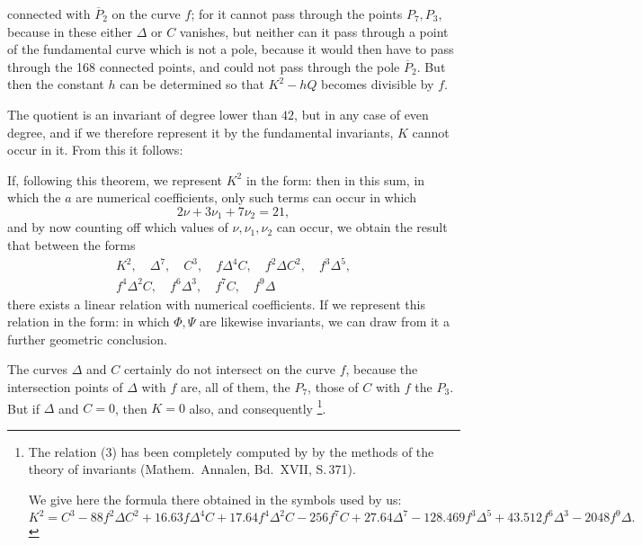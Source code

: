 connected with $\overline{P}_2$ on the curve $f$; for it
cannot pass through the points $P_7, P_3$, because in these either
$\Delta$ or $C$ vanishes, but neither can it pass through a
point of the fundamental curve which is not a pole, because it would then
have to pass through the 168 connected points, and could not pass
through the pole $\overline{P}_2$. But then the constant $h$
can be determined so that $K^2 - hQ$ becomes divisible by $f$.

The quotient is an invariant of degree lower than
$42$, but in any case of even degree, and if we therefore
represent it by the fundamental invariants, $K$ cannot
occur in it. From this it follows:

\begin{center}
\end{center}

If, following this theorem, we represent $K^2$ in the form:
then in this sum, in which the $a$ are numerical
coefficients, only such terms can occur in which
\[
2\nu + 3\nu_1 + 7\nu_2 = 21,
\]
and by now counting off which values of $\nu, \nu_1, \nu_2$
can occur, we obtain the result that between the
forms
\[
\begin{gathered}
K^2,\quad \Delta^7,\quad C^3,\quad f\Delta^4 C,\quad f^2\Delta C^2,\quad f^3\Delta^5,\\
f^4\Delta^2 C,\quad f^6\Delta^3,\quad f^7 C,\quad f^9\Delta
\end{gathered}
\]
there exists a linear relation with numerical coefficients.
If we represent this relation in the form:
in which $\Phi, \Psi$ are likewise invariants, we can draw
from it a further geometric conclusion.

The curves $\Delta$ and $C$ certainly do not intersect on the curve
$f$, because the intersection points of $\Delta$ with $f$ are, all of them, the
$P_7$, those of $C$ with $f$ the $P_3$. But if $\Delta$ and
$C = 0$, then $K = 0$ also, and consequently
\footnote{The relation (3) has been completely computed by  by the
methods of the theory of invariants (Mathem.\
Annalen, Bd.\ XVII, S.\,371).

We give here the formula there obtained in
the symbols used by us:
\[
K^2 = C^3 - 88f^2\Delta C^2 + 16.63f\Delta^4 C + 17.64f^4\Delta^2 C
- 256f^7 C + 27.64\Delta^7 - 128.469f^3\Delta^5 + 43.512f^6\Delta^3
- 2048f^9\Delta.
\]}.

